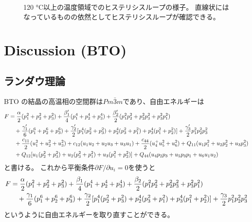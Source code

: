 \documentclass[9pt,dvipdfmx,a4paper]{jsarticle}
\begin{document}
\begin{figure}[H]
\begin{minipage}[t]{0.48\columnwidth}
        \caption{\small{120 \si{\degreeCelsius}以上の温度領域でのヒステリシスループの様子。
        直線状にはなっているものの依然としてヒステリシスループが確認できる。}}
        \label{graph:BTO_D-E_temp_para}
    \end{minipage}
\end{figure}

\section{Discussion (BTO)}
\subsection{ランダウ理論}
BTO の結晶の高温相の空間群は\(Pm\bar{3}m\)であり、自由エネルギーは
\begin{align}
    F
   &= \frac{\alpha}{2}(p_1^2+p_2^2+p_3^2)+\frac{\beta_1'}{4}(p_1^4+p_2^4+p_3^4)+\frac{\beta_2'}{2}(p_1^2p_2^2+p_2^2p_3^2+p_3^2p_1^2) \notag\\
   &\quad +\frac{\gamma'_1}{6}(p_1^6+p_2^6+p_3^6) + \frac{\gamma'_2}{2}[p_1^4(p_2^2+p_3^2)+p_2^4(p_3^2+p_1^2)+p_3^4(p_1^2+p_2^2)] +\frac{\gamma'_3}{2}p_1^2 p_2^2 p_3^2 \notag\\
   &\quad + \frac{c_{11}}{2}(u_1^2+u_2^2+u_3^2)+c_{12}(u_1u_2+u_2u_3+u_3u_1) + \frac{c_{44}}{2}(u_4^+u_5^2+u_6^2) +Q_{11}(u_1p_1^2+u_2p_2^2+u_3p_3^2)\notag\\
   &\quad +Q_{12}[u_1(p_2^2+p_3^2)+u_2(p_3^2+p_1^2)+u_3(p_1^2+p_2^2)]+Q_{44}(u_4p_2p_3+u_5p_3p_1+u_6u_1u_2)
\end{align}
と書ける\cite{ishibashi}。
これから平衡条件\(\partial F/ \partial u_i = 0\)を使うと
\begin{align}
    F
   &= \frac{\alpha}{2}(p_1^2+p_2^2+p_3^2)+\frac{\beta_1}{4}(p_1^4+p_2^4+p_3^4)+\frac{\beta_2}{2}(p_1^2p_2^2+p_2^2p_3^2+p_3^2p_1^2) \notag\\
   &\quad +\frac{\gamma_1}{6}(p_1^6+p_2^6+p_3^6) + \frac{\gamma_2}{2}[p_1^4(p_2^2+p_3^2)+p_2^4(p_3^2+p_1^2)+p_3^4(p_1^2+p_2^2)] +\frac{\gamma_3}{2}p_1^2 p_2^2 p_3^2
\end{align}
というように自由エネルギーを取り直すことができる。
\end{document}
